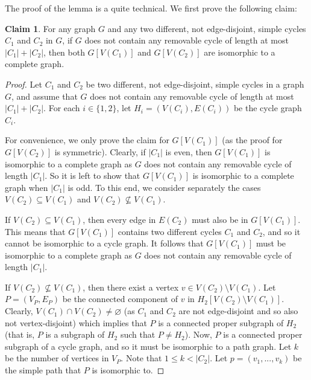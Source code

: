 \documentclass{article}
\theoremstyle{definition}
\newtheorem{claim}{Claim}[section]
\begin{document}
The proof of the lemma is a quite technical. We first prove the following claim:

\begin{claim} For any graph $G$ and any two different, not edge-disjoint, simple cycles $C_{1}$ and $C_{2}$ in $G$, if $G$ does not contain any removable cycle of length at most $|C_{1}| + |C_{2}|$, then both $G[V(C_{1})]$ and $G[V(C_{2})]$ are isomorphic to a complete graph. \label{claim:EachCycleIsClique} \end{claim}

\begin{proof} Let $C_{1}$ and $C_{2}$ be two different, not edge-disjoint, simple cycles in a graph $G$, and assume that $G$ does not contain any removable cycle of length at most $|C_{1}| + |C_{2}|$. For each $i \in \{1,2\}$, let $H_{i} = (V(C_{i}), E(C_{i}))$ be the cycle graph $C_{i}$.

For convenience, we only prove the claim for $G[V(C_{1})]$ (as the proof for $G[V(C_{2})]$ is symmetric). Clearly, if $|C_{1}|$ is even, then $G[V(C_{1})]$ is isomorphic to a complete graph as $G$ does not contain any removable cycle of length $|C_{1}|$. So it is left to show that $G[V(C_{1})]$ is isomorphic to a complete graph when $|C_{1}|$ is odd. To this end, we consider separately the cases $V(C_{2}) \subseteq V(C_{1})$ and $V(C_{2}) \not\subseteq V(C_{1})$.

If $V(C_{2}) \subseteq V(C_{1})$, then every edge in $E(C_{2})$ must also be in $G[V(C_{1})]$. This means that $G[V(C_{1})]$ contains two different cycles $C_{1}$ and $C_{2}$, and so it cannot be isomorphic to a cycle graph. It follows that $G[V(C_{1})]$ must be isomorphic to a complete graph as $G$ does not contain any removable cycle of length $|C_{1}|$.

If $V(C_{2}) \not\subseteq V(C_{1})$, then there exist a vertex $v \in V(C_{2}) \setminus V(C_{1})$.
Let $P = (V_{P},E_{P})$ be the connected component of $v$ in $H_{2}[V(C_{2}) \setminus V(C_{1})]$. Clearly, $V(C_{1}) \cap V(C_{2}) \ne \varnothing$ (as $C_{1}$ and $C_{2}$ are not edge-disjoint and so also not vertex-disjoint) which implies that $P$ is a connected proper subgraph of $H_{2}$ (that is, $P$ is a subgraph of $H_2$ such that $P \neq H_2$).
Now, $P$ is a connected proper subgraph of a cycle graph, and so it must be isomorphic to a path graph.
Let $k$ be the number of vertices in $V_P$. Note that $1 \le k < |C_{2}|$.
Let $p = (v_{1},...,v_{k})$ be the simple path that $P$ is isomorphic to.


\end{proof}
\end{document}
